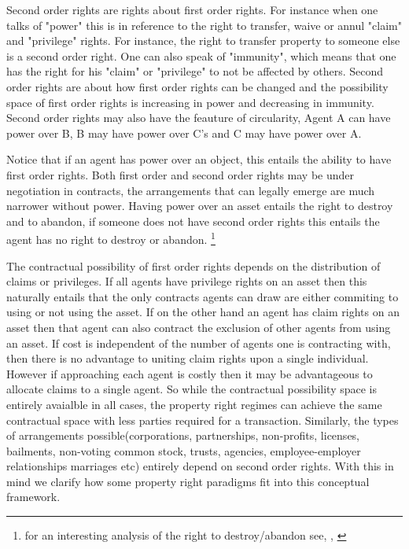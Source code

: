\documentclass[12pt]{article}
\numberwithin{equation}{section}
\begin{document}
Second order rights are rights about first order rights. For instance when one talks of "power" this is in reference to the right to transfer, waive or annul "claim" and "privilege" rights. For instance, the right to transfer property to someone else is a second order right. One can also speak of "immunity", which means that one has the right for his "claim" or "privilege" to not be affected by others. Second order rights are about how first order rights can be changed and the possibility space of first order rights is increasing in power and decreasing in immunity. Second order rights may also have the feauture of circularity, Agent A can have power over B, B may have power over C's  and C may have power over A.

Notice that if an agent has power over an object, this entails the ability to have first order rights. Both first order and second order rights may be under negotiation in contracts, the arrangements that can legally emerge are much narrower without power. Having power over an asset entails the right to destroy and to abandon, if someone does not have second order rights this entails the agent has no right to destroy or abandon. \footnote{for an interesting analysis of the right to destroy/abandon see, \cite{Strahilevitz2005}, \cite{Strahilevitz2009}} 

The contractual possibility of first order rights depends on the distribution of claims or privileges. If all agents have privilege rights on an asset then this naturally entails that the only contracts agents can draw are either commiting to using or not using the asset. If on the other hand an agent has claim rights on an asset then that agent can also contract the exclusion of other agents from using an asset. If cost is independent of the number of agents one is contracting with, then there is no advantage to uniting claim rights upon a single individual. However if approaching each agent is costly then it may be advantageous to allocate claims to a single agent. So while the contractual possibility space is entirely avaialble in all cases, the property right regimes can achieve the same contractual space with less parties required for a transaction. Similarly, the types of arrangements possible(corporations, partnerships, non-profits, licenses, bailments, non-voting common stock, trusts, agencies, employee-employer relationships marriages etc) entirely depend on second order rights. With this in mind we clarify how some property right paradigms fit into this conceptual framework. 
\end{document}
